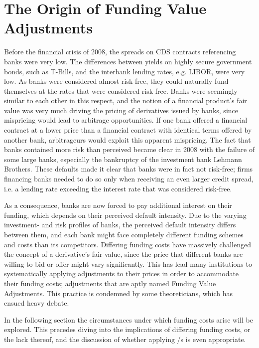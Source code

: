 \documentclass[main.tex]{subfiles}
\begin{document}
    \section{The Origin of Funding Value Adjustments}
        Before the financial crisis of 2008, the spreads on CDS contracts referencing banks were very low.
        The differences between yields on highly secure government bonds, such as T-Bills,
        and the interbank lending rates, e.g. LIBOR, were very low.
        As banks were considered almost risk-free, 
        they could naturally fund themselves at the rates that were considered risk-free.
        Banks were seemingly similar to each other in this respect, 
        and the notion of a financial product's fair value was very much driving the pricing of derivatives issued by banks,
        since mispricing would lead to arbitrage opportunities.
        If one bank offered a financial contract at a lower price than a financial contract with identical terms
        offered by another bank, arbitrageurs would exploit this apparent mispricing. 
        The fact that banks contained more risk than perceived became clear in 2008
        with the failure of some large banks, 
        especially the bankruptcy of the investment bank Lehmann Brothers.
        These defaults made it clear that banks were in fact not risk-free; 
        firms financing banks needed to do so only when receiving an even larger credit spread,
        i.e. a lending rate exceeding the interest rate that was considered risk-free. 
        
        As a consequence, banks are now forced to pay additional interest on their funding, 
        which depends on their perceived default intensity.
        Due to the varying investment- and risk profiles of banks, 
        the perceived default intensity differs between them, 
        and each bank might face completely different funding schemes and costs than its competitors.
        Differing funding costs have massively challenged the concept of a derivative's fair value,
        since the price that different banks are willing to bid or offer might vary significantly. 
        This has lead many institutions to systematically applying adjustments to their prices
        in order to accommodate their funding costs; 
        adjustments that are aptly named Funding Value Adjustments. 
        This practice is condemned by some theoreticians, 
        which has ensued heavy debate.
        
        In the following section the circumstances under which funding costs arise will be explored.
        This precedes diving into the implications of differing funding costs, or the lack thereof,
        and the discussion of whether applying \FVA/s is even appropriate.
\end{document}
